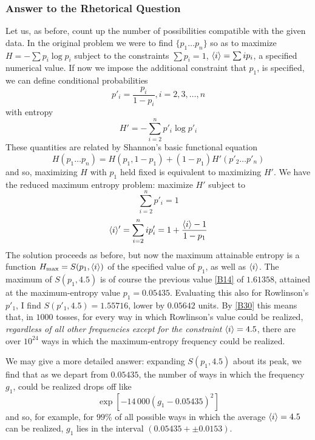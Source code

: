 \subsubsection{Answer to the Rhetorical Question}
Let us, as before, count up the number of possibilities compatible with the given data.
In the original problem we were to find $\{p_1\ldots p_n\}$ so as to maximize $H=-\sum p_i \log p_i$ subject to the constraints $\sum p_i = 1$, $\langle i\rangle = \sum ip_i$, a specified numerical value.
If now we impose the additional constraint that $p_1$, is specified, we can define conditional probabilities
\begin{equation}
	\label{B35}
	p'_i = \frac{p_i}{1 - p_i}, i = 2, 3, \ldots, n
\end{equation}
with entropy
\begin{equation}
	\label{B36}
	H' = - \sum_{i=2}^{n} p'_i \log p'_i
\end{equation}
These quantities are related by Shannon's basic functional equation
\begin{equation}
	\label{B37}
	H(p_1\ldots p_n) = H(p_1, 1-p_1) + (1-p_1)H' (p'_2\ldots p'_n)
\end{equation}
and so, maximizing $H$ with $p_1$ held fixed is equivalent to maximizing $H'$.
We have the reduced maximum entropy problem: maximize $H'$ subject to
\begin{equation}
	\label{B38}
	\sum_{i=2}^{n} p'_i = 1
\end{equation}
\begin{equation}
	\label{B39}
	\langle i\rangle' = \sum_{i=2}^{n} i p'_i = 1 + \frac{\langle i\rangle - 1}{1 - p_1}
\end{equation}
The solution proceeds as before, but now the maximum attainable entropy is a function $H_{\mathrm{max}} = S(p_1,\langle i\rangle)$ of the specified value of $p_1$, as well as $\langle i\rangle$.
The maximum of $S(p_1, 4.5)$ is of course the previous value \eqref{B14} of $1.61358$, attained at the maximum-entropy value $p_1 = 0.05435$.
Evaluating this also for Rowlinson's $p'_1$, I find $S(p'_1, 4.5) = 1.55716$, lower by $0.05642$ units.
By \eqref{B30} this means that, in $1000$ tosses, for every way in which Rowlinson's value could be realized, \emph{regardless of all other frequencies except for the constraint} $\langle i\rangle = 4.5$, there are over $10^{24}$ ways in which the maximum-entropy frequency could be realized.

We may give a more detailed answer: expanding $S(p_1, 4.5)$ about its peak, we find that as we depart from $0.05435$, the number of ways in which the frequency $g_1$, could be realized drops off like
\begin{equation}
	\label{B40}
	\exp[-14\,000 (g_1 - 0.05435)^2]
\end{equation}
and so, for example, for $99$\% of all possible ways in which the average $\langle i\rangle = 4.5$ can be realized, $g_1$ lies in the interval $(0.05435 +\pm 0.0153)$.

